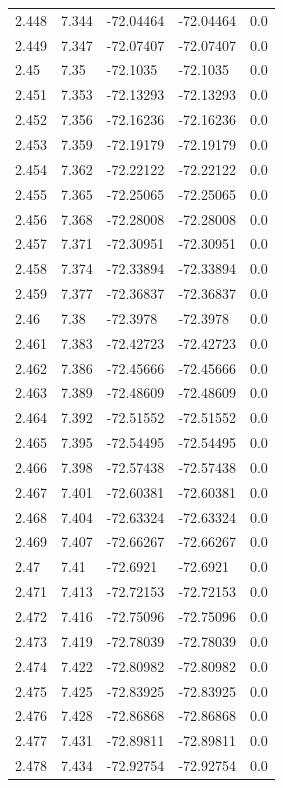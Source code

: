 \begin{tabular}{lllll}
2.448 & 7.344 & -72.04464 & -72.04464 & 0.0 \\
2.449 & 7.347 & -72.07407 & -72.07407 & 0.0 \\
2.45 & 7.35 & -72.1035 & -72.1035 & 0.0 \\
2.451 & 7.353 & -72.13293 & -72.13293 & 0.0 \\
2.452 & 7.356 & -72.16236 & -72.16236 & 0.0 \\
2.453 & 7.359 & -72.19179 & -72.19179 & 0.0 \\
2.454 & 7.362 & -72.22122 & -72.22122 & 0.0 \\
2.455 & 7.365 & -72.25065 & -72.25065 & 0.0 \\
2.456 & 7.368 & -72.28008 & -72.28008 & 0.0 \\
2.457 & 7.371 & -72.30951 & -72.30951 & 0.0 \\
2.458 & 7.374 & -72.33894 & -72.33894 & 0.0 \\
2.459 & 7.377 & -72.36837 & -72.36837 & 0.0 \\
2.46 & 7.38 & -72.3978 & -72.3978 & 0.0 \\
2.461 & 7.383 & -72.42723 & -72.42723 & 0.0 \\
2.462 & 7.386 & -72.45666 & -72.45666 & 0.0 \\
2.463 & 7.389 & -72.48609 & -72.48609 & 0.0 \\
2.464 & 7.392 & -72.51552 & -72.51552 & 0.0 \\
2.465 & 7.395 & -72.54495 & -72.54495 & 0.0 \\
2.466 & 7.398 & -72.57438 & -72.57438 & 0.0 \\
2.467 & 7.401 & -72.60381 & -72.60381 & 0.0 \\
2.468 & 7.404 & -72.63324 & -72.63324 & 0.0 \\
2.469 & 7.407 & -72.66267 & -72.66267 & 0.0 \\
2.47 & 7.41 & -72.6921 & -72.6921 & 0.0 \\
2.471 & 7.413 & -72.72153 & -72.72153 & 0.0 \\
2.472 & 7.416 & -72.75096 & -72.75096 & 0.0 \\
2.473 & 7.419 & -72.78039 & -72.78039 & 0.0 \\
2.474 & 7.422 & -72.80982 & -72.80982 & 0.0 \\
2.475 & 7.425 & -72.83925 & -72.83925 & 0.0 \\
2.476 & 7.428 & -72.86868 & -72.86868 & 0.0 \\
2.477 & 7.431 & -72.89811 & -72.89811 & 0.0 \\
2.478 & 7.434 & -72.92754 & -72.92754 & 0.0 \\

\end{tabular}
